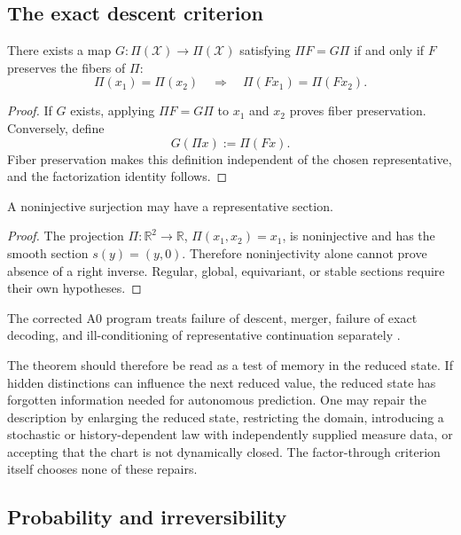 \documentclass[11pt]{article}
\begin{document}
\subsection{The exact descent criterion}

\begin{theorem}
\label{thm:descent}
There exists a map $G:\Pi(\mathcal X)\to\Pi(\mathcal X)$ satisfying
$\Pi F=G\Pi$ if and only if $F$ preserves the fibers of $\Pi$:
\[
\Pi(x_1)=\Pi(x_2)
\quad\Longrightarrow\quad
\Pi(Fx_1)=\Pi(Fx_2).
\]
\end{theorem}

\begin{proof}
If $G$ exists, applying $\Pi F=G\Pi$ to $x_1$ and $x_2$ proves fiber
preservation.  Conversely, define
\[
G(\Pi x):=\Pi(Fx).
\]
Fiber preservation makes this definition independent of the chosen
representative, and the factorization identity follows.
\end{proof}

\begin{proposition}
\label{prop:rightinverse}
A noninjective surjection may have a representative section.
\end{proposition}

\begin{proof}
The projection $\Pi:\mathbb R^2\to\mathbb R$,
$\Pi(x_1,x_2)=x_1$, is noninjective and has the smooth section
$s(y)=(y,0)$.  Therefore noninjectivity alone cannot prove absence of a right
inverse.  Regular, global, equivariant, or stable sections require their own
hypotheses.
\end{proof}

The corrected A0 program treats failure of descent, merger, failure of exact
decoding, and ill-conditioning of representative continuation separately
\cite{Nero2026_MTT_A0_StructuralCore}.

The theorem should therefore be read as a test of memory in the reduced state.
If hidden distinctions can influence the next reduced value, the reduced state
has forgotten information needed for autonomous prediction.  One may repair
the description by enlarging the reduced state, restricting the domain,
introducing a stochastic or history-dependent law with independently supplied
measure data, or accepting that the chart is not dynamically closed.  The
factor-through criterion itself chooses none of these repairs.

\subsection{Probability and irreversibility}
\end{document}
